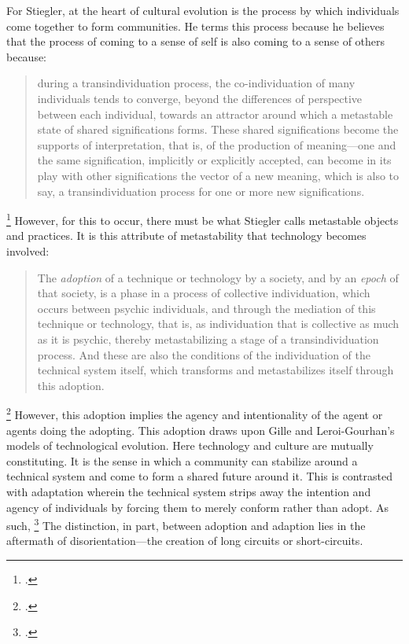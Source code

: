 \documentclass[letterpaper,notitlepage,12pt]{article}
\begin{document}
For Stiegler, at the heart of cultural evolution is the process by which
individuals come together to form communities.
He terms this process  because he believes that
the process of coming to a sense of self is also coming to a sense of others
because: \blockquote{during a transindividuation process, the co-individuation
  of many individuals tends to converge, beyond the differences of perspective
  between each individual, towards an attractor around which a metastable state
  of shared significations forms. These shared significations become the
  supports of interpretation, that is, of the production of meaning---one and
  the same signification, implicitly or explicitly accepted, can become in its
  play with other significations the vector of a new meaning, which is also to
say, a transindividuation process for one or more new
significations.}\footcite[p. 67]{stiegler_what_2013}
However, for this to occur, there must be what Stiegler calls metastable objects
and practices.
It is this attribute of metastability that technology becomes involved:
\blockquote{The \textit{adoption} of a technique or technology by a society, and 
  by an \textit{epoch} of that society, is a phase in a process of collective 
  individuation, which occurs between psychic individuals, and through the 
  mediation of this technique or technology, that is, as individuation that is 
  collective as much as it is psychic, thereby metastabilizing a stage of a
  transindividuation process. And these are also the conditions of the 
  individuation of the technical system itself, which transforms and 
metastabilizes itself through this adoption.}\footcite[p.
101]{stiegler_what_2013}
However, this adoption implies the agency and intentionality of the agent or
agents doing the adopting.
This adoption draws upon Gille and Leroi-Gourhan's models of technological
evolution.
Here technology and culture are mutually constituting.
It is the sense in which a community can stabilize around a technical system and
come to form a shared future around it.
This is contrasted with adaptation wherein the technical system strips away the
intention and agency of individuals by forcing them to merely conform rather
than adopt.
As such, \footcite[p.
102]{stiegler_what_2013}
The distinction, in part, between adoption and adaption lies in the aftermath of
disorientation---the creation of long circuits or short-circuits.
\end{document}
